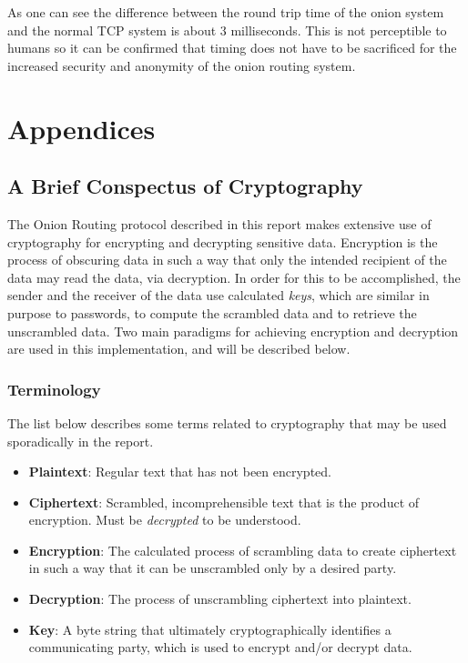 \documentclass[10pt]{report}
\begin{document}
As one can see the difference between the round trip time of the onion system and the normal TCP
system is about 3 milliseconds. This is not perceptible to humans so it can be confirmed that timing
does not have to be sacrificed for the increased security and anonymity of the onion routing system.

\part*{Appendices}
\begin{appendix}
    \chapter{A Brief Conspectus of Cryptography}
    The Onion Routing protocol described in this report makes extensive use of cryptography for
    encrypting and decrypting sensitive data. Encryption is the process of obscuring data in such a
    way that only the intended recipient of the data may read the data, via decryption. In order for
    this to be accomplished, the sender and the receiver of the data use calculated \textit{keys},
    which are similar in purpose to passwords, to compute the scrambled data and to retrieve the
    unscrambled data. Two main paradigms for achieving encryption and decryption are used in this
    implementation, and will be described below.
    \section{Terminology}
    The list below describes some terms related to cryptography that may be used sporadically in the
    report.
    \begin{itemize}
        \item \textbf{Plaintext}: Regular text that has not been encrypted.
        \item \textbf{Ciphertext}: Scrambled, incomprehensible text that is the product of
            encryption. Must be \textit{decrypted} to be understood.
        \item \textbf{Encryption}: The calculated process of scrambling data to create ciphertext in
            such a way that it can be unscrambled only by a desired party.
        \item \textbf{Decryption}: The process of unscrambling ciphertext into plaintext.
        \item \textbf{Key}: A byte string that ultimately cryptographically identifies a
            communicating party, which is used to encrypt and/or decrypt data.
    \end{itemize}

\end{appendix}
\end{document}
